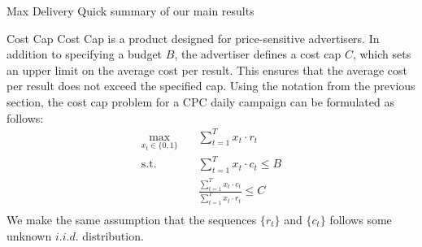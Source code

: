 \documentclass[../main.tex]{subfiles}
\begin{document}
\begin{section}{Max Delivery}
	Quick summary of our main results
	
	\end{section}
	
	\begin{section}{Cost Cap}
	Cost Cap is a product designed for price-sensitive advertisers. In addition to specifying a budget $B$, the advertiser defines a cost cap $C$, which sets an upper limit on the average cost per result. This ensures that the average cost per result does not exceed the specified cap. Using the notation from the previous section, the cost cap problem for a CPC daily campaign can be formulated as follows: 
	\begin{equation}  \label{eq:cost_cap}
		\begin{aligned}
			\max_{x_t \in \{0,1\}} \quad & \sum_{t=1}^T x_t \cdot r_t \\
			\text{s.t.} \quad &  \sum_{t=1}^{T} x_t \cdot c_t \leq B \\
			& \frac{ \sum_{t=1}^{T} x_t \cdot c_t} { \sum_{t=1}^{T} x_t \cdot r_t } \leq C \\
 		\end{aligned}
	\end{equation}
	We make the same assumption that the sequences  \(\{r_t\}\)  and \(\{c_t\}\) follows some unknown \(i.i.d.\) distribution.
	

\end{section}
\end{document}
